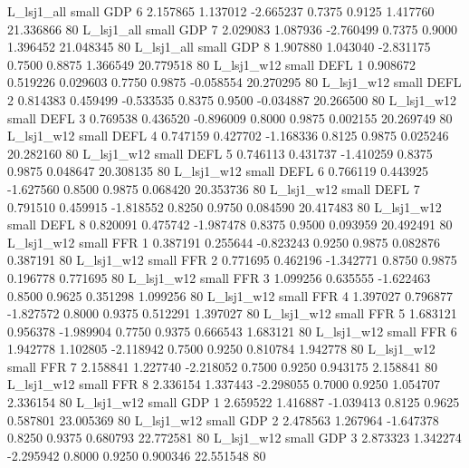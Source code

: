     L_lsj1_all      small      GDP                 6 2.157865 1.137012 -2.665237 0.7375 0.9125  1.417760   21.336866 80
    L_lsj1_all      small      GDP                 7 2.029083 1.087936 -2.760499 0.7375 0.9000  1.396452   21.048345 80
    L_lsj1_all      small      GDP                 8 1.907880 1.043040 -2.831175 0.7500 0.8875  1.366549   20.779518 80
    L_lsj1_w12      small     DEFL                 1 0.908672 0.519226  0.029603 0.7750 0.9875 -0.058554   20.270295 80
    L_lsj1_w12      small     DEFL                 2 0.814383 0.459499 -0.533535 0.8375 0.9500 -0.034887   20.266500 80
    L_lsj1_w12      small     DEFL                 3 0.769538 0.436520 -0.896009 0.8000 0.9875  0.002155   20.269749 80
    L_lsj1_w12      small     DEFL                 4 0.747159 0.427702 -1.168336 0.8125 0.9875  0.025246   20.282160 80
    L_lsj1_w12      small     DEFL                 5 0.746113 0.431737 -1.410259 0.8375 0.9875  0.048647   20.308135 80
    L_lsj1_w12      small     DEFL                 6 0.766119 0.443925 -1.627560 0.8500 0.9875  0.068420   20.353736 80
    L_lsj1_w12      small     DEFL                 7 0.791510 0.459915 -1.818552 0.8250 0.9750  0.084590   20.417483 80
    L_lsj1_w12      small     DEFL                 8 0.820091 0.475742 -1.987478 0.8375 0.9500  0.093959   20.492491 80
    L_lsj1_w12      small      FFR                 1 0.387191 0.255644 -0.823243 0.9250 0.9875  0.082876    0.387191 80
    L_lsj1_w12      small      FFR                 2 0.771695 0.462196 -1.342771 0.8750 0.9875  0.196778    0.771695 80
    L_lsj1_w12      small      FFR                 3 1.099256 0.635555 -1.622463 0.8500 0.9625  0.351298    1.099256 80
    L_lsj1_w12      small      FFR                 4 1.397027 0.796877 -1.827572 0.8000 0.9375  0.512291    1.397027 80
    L_lsj1_w12      small      FFR                 5 1.683121 0.956378 -1.989904 0.7750 0.9375  0.666543    1.683121 80
    L_lsj1_w12      small      FFR                 6 1.942778 1.102805 -2.118942 0.7500 0.9250  0.810784    1.942778 80
    L_lsj1_w12      small      FFR                 7 2.158841 1.227740 -2.218052 0.7500 0.9250  0.943175    2.158841 80
    L_lsj1_w12      small      FFR                 8 2.336154 1.337443 -2.298055 0.7000 0.9250  1.054707    2.336154 80
    L_lsj1_w12      small      GDP                 1 2.659522 1.416887 -1.039413 0.8125 0.9625  0.587801   23.005369 80
    L_lsj1_w12      small      GDP                 2 2.478563 1.267964 -1.647378 0.8250 0.9375  0.680793   22.772581 80
    L_lsj1_w12      small      GDP                 3 2.873323 1.342274 -2.295942 0.8000 0.9250  0.900346   22.551548 80
